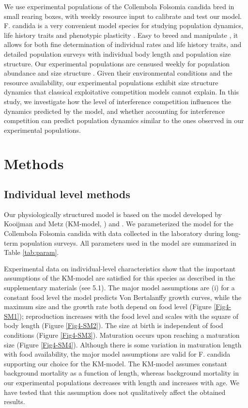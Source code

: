 We use experimental populations of the Collembola Folsomia candida bred in small
rearing boxes, with weekly resource input \autocite{tully2008a} to calibrate and
test our model. F. candida is a very convenient model species for studying
population dynamics, life history traits and phenotypic plasticity
\autocite{tully2005a,tully2008a}. Easy to breed and manipulate
\autocite{fountain2005a}, it allows for both fine determination of individual
rates and life history traits, and detailed population surveys with individual
body length and population size structure. Our experimental populations are
censused weekly for population abundance and size structure
\autocite{mallard2012a,mallard2013a}. Given their environmental conditions and
the resource availability, our experimental populations exhibit size structure
dynamics that classical exploitative competition models cannot explain. In this
study, we investigate how the level of interference competition influences the
dynamics predicted by the model, and whether accounting for interference
competition can predict population dynamics similar to the ones observed in our
experimental populations.



\section{Methods}

\subsection{Individual level methods}

Our physiologically structured model is based on the model developed by Kooijman
and Metz (KM-model, \citeyear{kooijman1984a}) and \textcite{de-roos1992a}. We
parameterized the model for the Collembola Folsomia candida with data collected
in the laboratory during long-term population surveys. All parameters used in
the model are summarized in Table \ref{tab:param}.

Experimental data on individual-level characteristics show that the important
assumptions of the KM-model are satisfied for this species as described in the
supplementary materials (see 5.1). The major model assumptions are (i) for a
constant food level the model predicts Von Bertalanffy growth curves, while the
maximum size and the growth rate both depend on food level (Figure
\ref{Fig4-SM1}); reproduction increases with the food level and scales with the
square of body length (Figure \ref{Fig4-SM2}). The size at birth is independent
of food conditions (Figure \ref{Fig4-SM3}). Maturation occurs upon reaching a
maturation size (Figure \ref{Fig4-SM4}). Although there is some variation in maturation
length with food availability, the major model assumptions are valid for F.
candida supporting our choice for the KM-model. The KM-model assumes constant
background mortality as a function of length, whereas background mortality in
our experimental populations decreases with length and increases with age. We
have tested that this assumption does not qualitatively affect the obtained
results.

